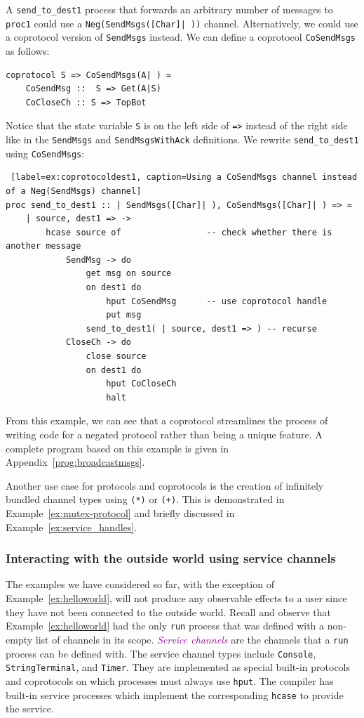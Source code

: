 \documentclass[acmsmall]{acmart}
\newcommand{\tc}[1]{\textcolor{darkMagenta}{\textit{#1}}}
\begin{document}
A \lstinline$send_to_dest1$ process that forwards an arbitrary number of messages to \lstinline$proc1$ could use a \lstinline$Neg(SendMsgs([Char]| ))$ channel.
Alternatively, we could use a coprotocol version of \lstinline$SendMsgs$ instead.
We can define a coprotocol \lstinline$CoSendMsgs$ as follows:
 \begin{lstlisting}[label=ex:coprotocolcopassmsgs, caption=Coprotocol for sending an arbitrary number of messages]
coprotocol S => CoSendMsgs(A| ) =
	CoSendMsg ::  S => Get(A|S)
	CoCloseCh :: S => TopBot
\end{lstlisting}
Notice that the state variable \lstinline$S$ is on the left side of \lstinline$=>$ instead of the right side like in the \lstinline$SendMsgs$ and \lstinline$SendMsgsWithAck$ definitions.
We rewrite \lstinline$send_to_dest1$ using \lstinline$CoSendMsgs$:
\begin{lstlisting} [label=ex:coprotocoldest1, caption=Using a CoSendMsgs channel instead of a Neg(SendMsgs) channel] 
proc send_to_dest1 :: | SendMsgs([Char]| ), CoSendMsgs([Char]| ) => =
	| source, dest1 => -> 
		hcase source of					-- check whether there is another message
			SendMsg -> do
				get msg on source 		
				on dest1 do
					hput CoSendMsg		-- use coprotocol handle
					put msg
				send_to_dest1( | source, dest1 => ) -- recurse
			CloseCh -> do
				close source
				on dest1 do
					hput CoCloseCh
					halt
 \end{lstlisting}
From this example, we can see that a coprotocol streamlines the process of writing code for a negated protocol rather than being a unique feature. 
A complete program based on this example is given in Appendix~\ref{prog:broadcastmsgs}.

Another use case for protocols and coprotocols is the creation of infinitely bundled channel types using \lstinline{(*)} or \lstinline{(+)}.
This is demonstrated in Example~\ref{ex:mutex-protocol} and briefly discussed in Example~\ref{ex:service_handles}.


\subsubsection{Interacting with the outside world using service channels}
\label{Sec:ServiceChannels}

The examples we have considered so far, with the exception of Example~\ref{ex:helloworld}, will not produce any observable effects to a user since they have not been connected to the outside world.
Recall and observe that Example~\ref{ex:helloworld} had the only \lstinline$run$ process that was defined with a non-empty list of channels in its scope.
\tc{Service channels} are the channels that a \lstinline$run$ process can be defined with. The service channel types include \lstinline$Console$, \lstinline$StringTerminal$, and \lstinline$Timer$. 
They are implemented as special built-in protocols and coprotocols on which processes must always use \lstinline$hput$.
The compiler has built-in service processes which implement the corresponding \lstinline$hcase$ to provide the service.
\end{document}
